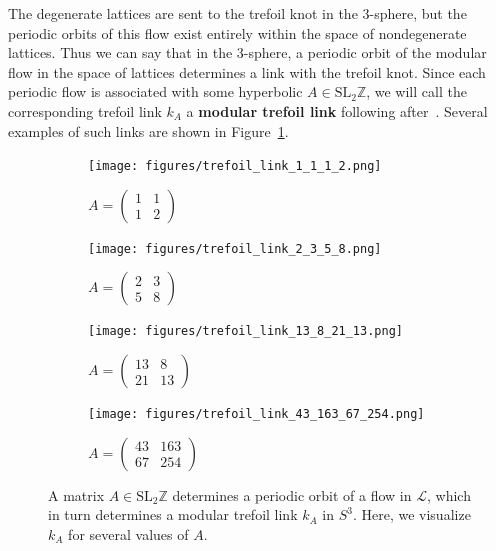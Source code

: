 \documentclass[12pt,twoside]{reedthesis}
\theoremstyle{definition}
\newcommand{\Z}{\mathbb{Z}}
\newcommand{\LS}{\mathcal{L}}
\newcommand{\SLZ}{\mathrm{SL}_2{\Z}}
\newcommand{\defnphrase}[1]{\textbf{#1}}
\begin{document}
The degenerate lattices are sent to the trefoil knot in the 3-sphere, but the periodic orbits of this flow exist entirely within the space of nondegenerate lattices.
Thus we can say that in the 3-sphere, a periodic orbit of the modular flow in the space of lattices determines a link with the trefoil knot.
Since each periodic flow is associated with some hyperbolic $A \in \SLZ$, we will call the corresponding trefoil link $k_A$ a \defnphrase{modular trefoil link} following after~\cite{ghys2007}.
Several examples of such links are shown in Figure~\ref{fig:trefoil_links}.

\begin{figure}[h!]
  \centering
  \begin{subfigure}[t]{0.48\textwidth}
    \centering
    \texttt{[image: figures/trefoil\_link\_1\_1\_1\_2.png]}
    \caption*{$A = \begin{pmatrix}1 & 1 \\ 1 & 2\end{pmatrix}$}
  \end{subfigure}
  \hfill
  \begin{subfigure}[t]{0.48\textwidth}
    \centering
    \texttt{[image: figures/trefoil\_link\_2\_3\_5\_8.png]}
    \caption*{$A = \begin{pmatrix}2 & 3 \\ 5 & 8\end{pmatrix}$}
  \end{subfigure}
  \begin{subfigure}[t]{0.48\textwidth}
    \centering
    \texttt{[image: figures/trefoil\_link\_13\_8\_21\_13.png]}
    \caption*{$A = \begin{pmatrix}13 & 8 \\ 21 & 13\end{pmatrix}$}
  \end{subfigure}
  \hfill
  \begin{subfigure}[t]{0.48\textwidth}
    \centering
    \texttt{[image: figures/trefoil\_link\_43\_163\_67\_254.png]}
    \caption*{$A = \begin{pmatrix}43 & 163\\ 67 & 254\end{pmatrix}$}
  \end{subfigure}
  \caption{A matrix $A \in \SLZ$ determines a periodic orbit of a flow in $\LS$, which in turn determines a modular trefoil link $k_A$ in $S^3$. Here, we visualize $k_A$ for several values of $A$.}
  \label{fig:trefoil_links}
\end{figure}
\end{document}
